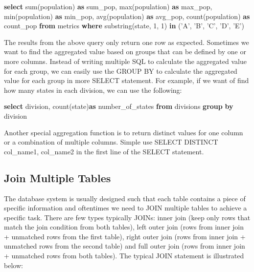 \documentclass[]{book}
\newenvironment{Shaded}{\begin{snugshade}}{\end{snugshade}}
\newcommand{\KeywordTok}[1]{\textcolor[rgb]{0.13,0.29,0.53}{\textbf{{#1}}}}
\newcommand{\DecValTok}[1]{\textcolor[rgb]{0.00,0.00,0.81}{{#1}}}
\newcommand{\StringTok}[1]{\textcolor[rgb]{0.31,0.60,0.02}{{#1}}}
\newcommand{\FunctionTok}[1]{\textcolor[rgb]{0.00,0.00,0.00}{{#1}}}
\newcommand{\NormalTok}[1]{{#1}}
\theoremstyle{definition}
\theoremstyle{definition}
\theoremstyle{remark}
\begin{document}
\begin{Shaded}
\begin{Highlighting}[]
\KeywordTok{select} \FunctionTok{sum}\NormalTok{(population) }\KeywordTok{as} \NormalTok{sum_pop, }\FunctionTok{max}\NormalTok{(population) }\KeywordTok{as} 
    \NormalTok{max_pop, }\FunctionTok{min}\NormalTok{(population) }\KeywordTok{as} \NormalTok{min_pop, }\FunctionTok{avg}\NormalTok{(population)}
    \KeywordTok{as} \NormalTok{avg_pop, }\FunctionTok{count}\NormalTok{(population) }\KeywordTok{as} \NormalTok{count_pop}
\KeywordTok{from} \NormalTok{metrics}
\KeywordTok{where} \NormalTok{substring(state, }\DecValTok{1}\NormalTok{, }\DecValTok{1}\NormalTok{) }\KeywordTok{in} \NormalTok{(}\StringTok{'A'}\NormalTok{, }\StringTok{'B'}\NormalTok{, }\StringTok{'C'}\NormalTok{, }\StringTok{'D'}\NormalTok{, }\StringTok{'E'}\NormalTok{)}
\end{Highlighting}
\end{Shaded}

The results from the above query only return one row as expected.
Sometimes we want to find the aggregated value based on groups that can
be defined by one or more columns. Instead of writing multiple SQL to
calculate the aggregated value for each group, we can easily use the
GROUP BY to calculate the aggregated value for each group in more SELECT
statement. For example, if we want of find how many states in each
division, we can use the following:

\begin{Shaded}
\begin{Highlighting}[]
\KeywordTok{select} \NormalTok{division, }\FunctionTok{count}\NormalTok{(state)}\KeywordTok{as} \NormalTok{number_of_states}
\KeywordTok{from} \NormalTok{divisions}
\KeywordTok{group} \KeywordTok{by} \NormalTok{division}
\end{Highlighting}
\end{Shaded}

Another special aggregation function is to return distinct values for
one column or a combination of multiple columns. Simple use SELECT
DISTINCT col\_name1, col\_name2 in the first line of the SELECT
statement.

\subsection{Join Multiple Tables}\label{join-multiple-tables}

The database system is usually designed such that each table contains a
piece of specific information and oftentimes we need to JOIN multiple
tables to achieve a specific task. There are few types typically JOINs:
inner join (keep only rows that match the join condition from both
tables), left outer join (rows from inner join + unmatched rows from the
first table), right outer join (rows from inner join + unmatched rows
from the second table) and full outer join (rows from inner join +
unmatched rows from both tables). The typical JOIN statement is
illustrated below:
\end{document}
